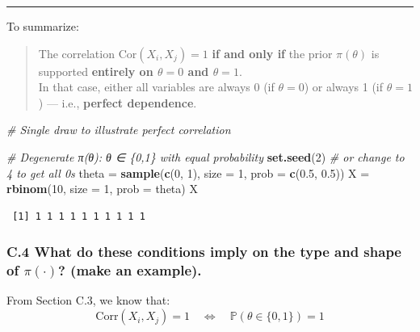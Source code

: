 \documentclass[
]{article}
\newenvironment{Shaded}{\begin{snugshade}}{\end{snugshade}}
\newcommand{\AttributeTok}[1]{\textcolor[rgb]{0.13,0.29,0.53}{#1}}
\newcommand{\CommentTok}[1]{\textcolor[rgb]{0.56,0.35,0.01}{\textit{#1}}}
\newcommand{\DecValTok}[1]{\textcolor[rgb]{0.00,0.00,0.81}{#1}}
\newcommand{\FloatTok}[1]{\textcolor[rgb]{0.00,0.00,0.81}{#1}}
\newcommand{\FunctionTok}[1]{\textcolor[rgb]{0.13,0.29,0.53}{\textbf{#1}}}
\newcommand{\NormalTok}[1]{#1}
\newcommand{\OtherTok}[1]{\textcolor[rgb]{0.56,0.35,0.01}{#1}}
\begin{document}
\begin{center}\rule{0.5\linewidth}{0.5pt}\end{center}

To summarize:

\begin{quote}
The correlation \(\text{Cor}(X_i, X_j) = 1\) \textbf{if and only if} the
prior \(\pi(\theta)\) is supported \textbf{entirely on \(\theta = 0\)
and \(\theta = 1\)}.\\
In that case, either all variables are always 0 (if \(\theta = 0\)) or
always 1 (if \(\theta = 1\)) --- i.e., \textbf{perfect dependence}.
\end{quote}

\begin{Shaded}
\begin{Highlighting}[]
\CommentTok{\# Single draw to illustrate perfect correlation}

\CommentTok{\# Degenerate π(θ): θ ∈ \{0,1\} with equal probability}
\FunctionTok{set.seed}\NormalTok{(}\DecValTok{2}\NormalTok{)  }\CommentTok{\# or change to 4 to get all 0s}
\NormalTok{theta }\OtherTok{=} \FunctionTok{sample}\NormalTok{(}\FunctionTok{c}\NormalTok{(}\DecValTok{0}\NormalTok{, }\DecValTok{1}\NormalTok{), }\AttributeTok{size =} \DecValTok{1}\NormalTok{, }\AttributeTok{prob =} \FunctionTok{c}\NormalTok{(}\FloatTok{0.5}\NormalTok{, }\FloatTok{0.5}\NormalTok{))}
\NormalTok{X }\OtherTok{=} \FunctionTok{rbinom}\NormalTok{(}\DecValTok{10}\NormalTok{, }\AttributeTok{size =} \DecValTok{1}\NormalTok{, }\AttributeTok{prob =}\NormalTok{ theta)}
\NormalTok{X}
\end{Highlighting}
\end{Shaded}

\begin{verbatim}
 [1] 1 1 1 1 1 1 1 1 1 1
\end{verbatim}

\subsubsection{\texorpdfstring{C.4 What do these conditions imply on the
type and shape of \(\pi(\cdot)\)? (make an
example).}{C.4 What do these conditions imply on the type and shape of \textbackslash pi(\textbackslash cdot)? (make an example).}}\label{c.4-what-do-these-conditions-imply-on-the-type-and-shape-of-picdot-make-an-example.}

From Section C.3, we know that: \[
\text{Corr}(X_i, X_j) = 1 \quad \Leftrightarrow \quad \mathbb{P}(\theta \in \{0, 1\}) = 1
\]
\end{document}
